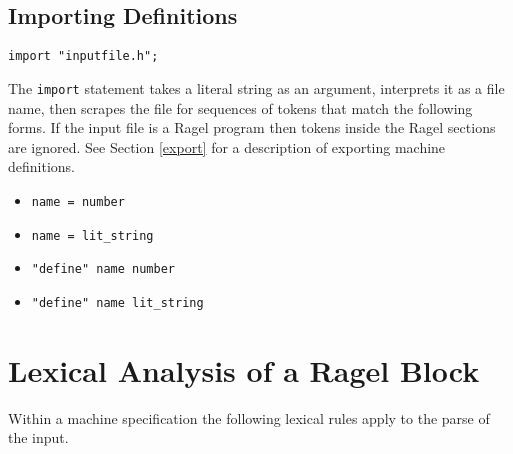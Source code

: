 \documentclass[letterpaper,11pt,oneside]{book}
\newcommand{\verbspace}{\vspace{10pt}}
\begin{document}
\subsection{Importing Definitions}
\label{import}

\begin{verbatim}
import "inputfile.h";
\end{verbatim}
\verbspace

The \verb|import| statement takes a literal string as an argument, interprets
it as a file name, then scrapes the file for sequences of tokens that match the
following forms. If the input file is a Ragel program then tokens inside the
Ragel sections are ignored. See Section \ref{export} for a description of
exporting machine definitions.

\begin{itemize}
	\setlength{\itemsep}{-2mm}
    \item \verb|name = number|
    \item \verb|name = lit_string|
    \item \verb|"define" name number|
    \item \verb|"define" name lit_string|
\end{itemize}


\section{Lexical Analysis of a Ragel Block}
\label{lexing}

Within a machine specification the following lexical rules apply to the parse
of the input.
\end{document}
